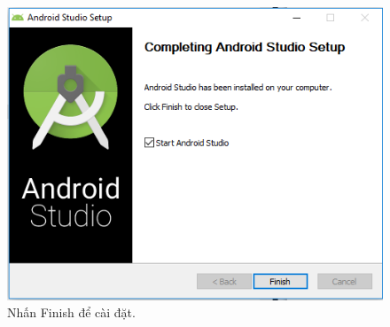 \begin{enumerate}
\begin{center}
    \begin{figure}[htp]
    \begin{center}
     \includegraphics[scale=0.6]{image3/caidat5}
    \end{center}
    \caption{Nhấn Finish để cài đặt.}
    \label{refhinh1}
    \end{figure}
\end{center}
 \end{enumerate}
 
\newpage
